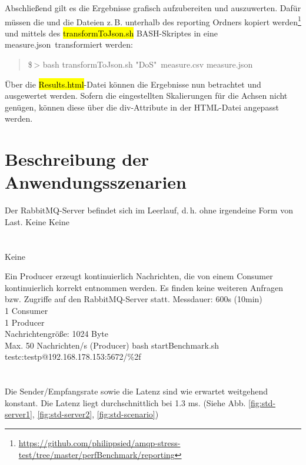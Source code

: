 \documentclass[	a4paper,
			11pt,
			oneside,
			parskip]{scrartcl}
\begin{document}
	Abschließend gilt es die Ergebnisse grafisch aufzubereiten und auszuwerten. Dafür müssen die  und die  Dateien z.\,B. unterhalb des reporting Ordners kopiert
	werden\footnote{\url{https://github.com/philippsied/amqp-stress-test/tree/master/perfBenchmark/reporting}} und mittels des \hl{transformToJson.sh} BASH-Skriptes in eine \glqq measure.json\grqq\
	transformiert werden:
	\begin{quote}
		\ttfamily
		\$\,> bash transformToJson.sh "DoS"\ measure.csv measure.json
	\end{quote}
	Über die \hl{Results.html}-Datei können die Ergebnisse nun betrachtet und ausgewertet werden. Sofern die eingestellten Skalierungen für die Achsen nicht genügen, können diese über die div-Attribute
	in der HTML-Datei angepasst werden.
	
	
	
\clearpage
\section*{Beschreibung der Anwendungsszenarien}
		{Der RabbitMQ-Server befindet sich im Leerlauf, d.\,h. ohne irgendeine Form von Last.}%
		{Keine}%
		{Keine}%
		{%
		 \\
		 \\
		 \\
		}%
		{Keine}
	
		{Ein Producer erzeugt kontinuierlich Nachrichten, die von einem Consumer kontinuierlich korrekt entnommen werden. Es finden keine weiteren Anfragen bzw. Zugriffe auf den RabbitMQ-Server statt.}%
		{%
		 Messdauer: 600s (10min)\\
		 1 Consumer \\
		 1 Producer \\
		 Nachrichtengröße: 1024 Byte\\
		 Max. 50 Nachrichten/s (Producer)
		}%
		{bash startBenchmark.sh testc:testp@192.168.178.153:5672/\%2f}%
		{%
		 \\
		 \\
		 \\
		}%
		{
		 Die Sender/Empfangsrate sowie die Latenz sind wie erwartet weitgehend konstant. Die Latenz liegt durchschnittlich bei 1.3 ms.
		 (Siehe Abb. \ref{fig:std-server1}, \ref{fig:std-server2}, \ref{fig:std-scenario})
		}
		
\end{document}
